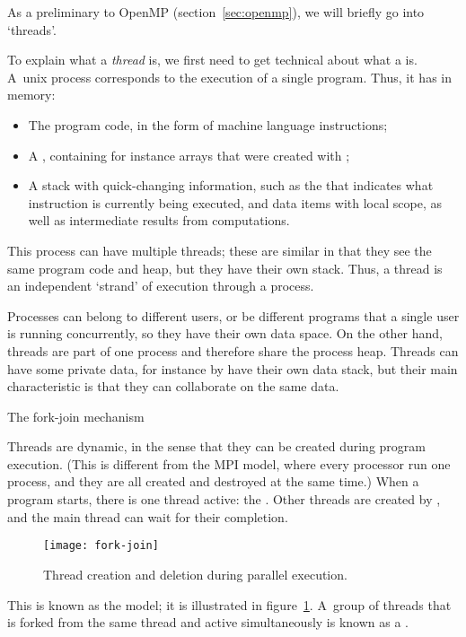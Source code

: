 
As a preliminary to OpenMP (section~\ref{sec:openmp}), we will briefly
go into `threads'.

To explain what a \emph{thread} is, we first need to get
technical about what a  is.
A~unix process corresponds to the execution of a single program.
Thus, it has in memory:
\begin{itemize}
\item The program code, in the form of machine language instructions;
\item A , containing for instance arrays that were
  created with ;
\item A stack with quick-changing information, such as the
   that indicates what instruction is
  currently being executed, and data items with local scope, as well
  as intermediate results from computations.
\end{itemize}
This process can have multiple threads; these are similar
in that they see the same program code and heap, 
but they have their own stack. Thus, a thread is an independent
`strand' of execution through a process.

Processes can belong to different users, or be different
programs that a single user is running concurrently, so they
have their own data space.
On the other hand, threads are part of one process and
therefore share the process heap.
Threads can have some
private data, for instance by have their own data stack, but
their main characteristic is that they can collaborate on the same
data. 

 {The fork-join mechanism}

Threads are dynamic, in the sense that they can be created during program 
execution. (This is different from the MPI model, where every processor
run one process, and they are all created and destroyed at the same time.)
When a program starts, there is one thread active: the .
Other threads are created by , and
the main thread can wait for their completion.
\begin{figure}[ht]
\texttt{[image: fork-join]}
\caption{Thread creation and deletion during parallel execution.}
\label{fig:forkjoin}
\end{figure}
This is known as the  model; it is illustrated
in figure~\ref{fig:forkjoin}. A~group of threads that is 
forked from the same thread and active simultaneously is known
as a .

